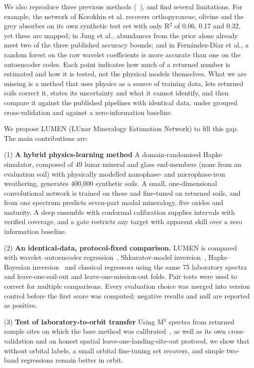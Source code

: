 \documentclass[remotesensing,article,submit,pdftex,moreauthors]{Definitions/mdpi}
\begin{document}
We also reproduce three previous methods (~\cite{fernandez2026,korokhin2024,jung2026}), and find several limitations. For example, the network of Korokhin et al. recovers orthopyroxene, olivine and the grey absorber on its own synthetic test set with only R$^{2}$ of 0.06, 0.17 and 0.32, yet these are mapped; in Jung et al., abundances from the prior alone already meet two of the three published accuracy bounds; and in Fernández-Díaz et al., a random forest on the raw wavelet coefficients is more accurate than one on the autoencoder codes. Each point indicates how much of a returned number is estimated and how it is tested, not the physical models themselves. What we are missing is a method that uses physics as a source of training data, lets returned soils correct it, states its uncertainty and what it cannot identify, and then compare it against the published pipelines with identical data, under grouped cross-validation and against a zero-information baseline.

We propose LUMEN (LUnar Mineralogy Estimation Network) to fill this gap. The main contributions are:

(1) \textbf{A hybrid physics-learning method} A domain-randomised Hapke simulator, composed of 49 lunar mineral and glass end-members (none from an evaluation soil) with physically modelled nanophase- and microphase-iron weathering, generates 400,000 synthetic soils. A small, one-dimensional convolutional network is trained on these and fine-tuned on returned soils, and from one spectrum predicts seven-part modal mineralogy, five oxides and maturity. A deep ensemble with conformal calibration supplies intervals with verified coverage, and a gate restricts any target with apparent skill over a zero information baseline.

(2) \textbf{An identical-data, protocol-fixed comparison.} LUMEN is compared with wavelet--autoencoder regression~\cite{fernandez2026}, Shkuratov-model inversion~\cite{korokhin2024}, Hapke--Bayesian inversion~\cite{jung2026} and classical regressors using the same 75 laboratory spectra and leave-one-soil-out and leave-one-mission-out folds. Pair tests were used to correct for multiple comparisons. Every evaluation choice was merged into version control before the first score was computed; negative results and null are reported as positive.

(3) \textbf{Test of laboratory-to-orbit transfer} Using M$^{3}$ spectra from returned sample sites on which the base method was calibrated~\cite{fernandez2026,qiu2025}, as well as its own cross-validation and an honest spatial leave-one-landing-site-out protocol, we show that without orbital labels, a small orbital fine-tuning set recovers, and simple two-band regressions remain better in orbit.
\end{document}
